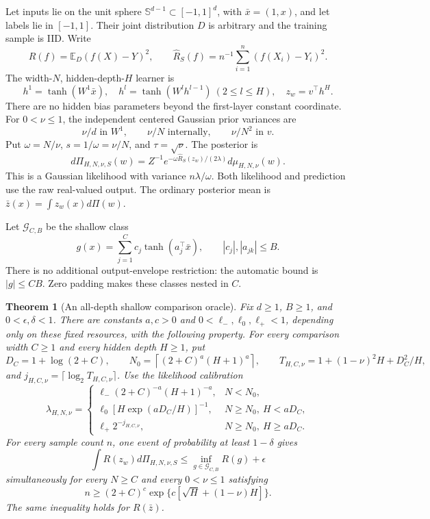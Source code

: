 \documentclass[11pt]{article}
\newtheorem{theorem}{Theorem}[section]\newtheorem{lemma}[theorem]{Lemma}\newtheorem{proposition}[theorem]{Proposition}\newtheorem{corollary}[theorem]{Corollary}
\newcommand{\E}{\mathbb E}\newcommand{\R}{\mathbb R}\newcommand{\KL}{\operatorname{KL}}\newcommand{\op}{\mathrm{op}}
\begin{document}
Let inputs lie on the unit sphere $\mathbb S^{d-1}\subset[-1,1]^d$, with $\bar x=(1,x)$, and let labels lie in $[-1,1]$. Their joint distribution $D$ is arbitrary and the training sample is IID. Write
\[
 R(f)=\E_D(f(X)-Y)^2,\qquad
 \widehat R_S(f)=n^{-1}\sum_{i=1}^n(f(X_i)-Y_i)^2.
\]
The width-$N$, hidden-depth-$H$ learner is
\[
 h^1=\tanh(W^1\bar x),\quad
 h^l=\tanh(W^lh^{l-1})\ (2\le l\le H),\quad
 z_w=v^\top h^H.
\]
There are no hidden bias parameters beyond the first-layer constant coordinate. For $0<\nu\le1$, the independent centered Gaussian prior variances are
\[
 \nu/d\text{ in }W^1,\qquad \nu/N\text{ internally},\qquad
 \nu/N^2\text{ in }v.
\]
Put $\omega=N/\nu$, $s=1/\omega=\nu/N$, and $\tau=\sqrt\nu$. The posterior is
\begin{equation}
 d\Pi_{H,N,\nu,S}(w)=Z^{-1}
       e^{-\omega\widehat R_S(z_w)/(2\lambda)}d\mu_{H,N,\nu}(w).
 \label{eq:posterior}
\end{equation}
This is a Gaussian likelihood with variance $n\lambda/\omega$. Both likelihood and prediction use the raw real-valued output. The ordinary posterior mean is $\bar z(x)=\int z_w(x)d\Pi(w)$.

Let $\mathcal G_{C,B}$ be the shallow class
\[
 g(x)=\sum_{j=1}^C c_j\tanh(a_j^\top\bar x),
 \qquad |c_j|,|a_{jk}|\le B.
\]
There is no additional output-envelope restriction: the automatic bound is $|g|\le CB$. Zero padding makes these classes nested in $C$.

\begin{theorem}[An all-depth shallow comparison oracle]
\label{thm:main-shallow}
Fix $d\ge1$, $B\ge1$, and $0<\epsilon,\delta<1$. There are constants $a,c>0$ and $0<\ell_-,\ell_0,\ell_+<1$, depending only on these fixed resources, with the following property. For every comparison width $C\ge1$ and every hidden depth $H\ge1$, put
\[
 D_C=1+\log(2+C),\qquad
 N_0=\left\lceil(2+C)^a(H+1)^a\right\rceil,
 \qquad
 T_{H,C,\nu}=1+(1-\nu)^2H+D_C^2/H,
\]
and $j_{H,C,\nu}=\lceil\log_2 T_{H,C,\nu}\rceil$. Use the likelihood calibration
\[
 \lambda_{H,N,\nu}=
 \begin{cases}
 \ell_- (2+C)^{-a}(H+1)^{-a},&N<N_0,\\
 \ell_0[H\exp(aD_C/H)]^{-1},&N\ge N_0,\ H<aD_C,\\
 \ell_+2^{-j_{H,C,\nu}},&N\ge N_0,\ H\ge aD_C.
 \end{cases}
\]
For every sample count $n$, one event of probability at least $1-\delta$ gives
\begin{equation}
 \int R(z_w)d\Pi_{H,N,\nu,S}
 \le\inf_{g\in\mathcal G_{C,B}}R(g)+\epsilon
 \label{eq:main-shallow}
\end{equation}
simultaneously for every $N\ge C$ and every $0<\nu\le1$ satisfying
\begin{equation}
 n\ge(2+C)^c\exp\{c[\sqrt H+(1-\nu)H]\}.
 \label{eq:main-shallow-budget}
\end{equation}
The same inequality holds for $R(\bar z)$.
\end{theorem}
\end{document}
